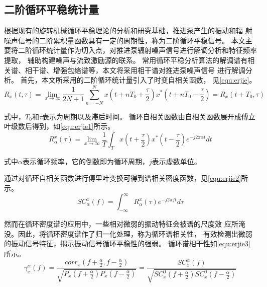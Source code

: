 \subsection{二阶循环平稳统计量}
根据现有的旋转机械循环平稳理论的分析和研究基础，推进泵产生的振动和辐
射噪声信号的二阶累积量函数具有一定的周期性，称为二阶循环平稳信号。
本文主要将二阶循环统计量作为切入点，对推进泵辐射噪声信号进行解调分析和特征频率提取，
辅助构建噪声与流致激励源的联系。
常用循环平稳分析算法的解调谱有相关谱、相干谱、增强包络谱等，本文将采用相干谱对推进泵噪声信号
进行解调分析。
首先，本文所采用的二阶循环统计量引入了时变自相关函数，
见\autoref{equ:erjie}。 
\begin{equation}
    \label{equ:erjie}
    R_{x} \left ( t,\tau  \right ) =\lim_{x \to \infty} \frac{1}{2N+1} \sum_{n=-N}^{N} x\left ( t+nT_0+\frac{\tau }{2}  \right )x^{\ast }\left ( t+nT_0-\frac{\tau }{2}  \right )=R_{x}\left ( t+T_0,\tau  \right )    
\end{equation}

式中，$T_0$和$\tau$表示为周期以及滞后时间。
循环自相关函数由自相关函数展开成傅立叶级数后得到，如\autoref{equ:erjie1}所示。
\begin{equation}
    \label{equ:erjie1}
    R_{\alpha }^{x} \left ( \tau  \right ) =\lim_{x \to \infty} \frac{1}{T}\int_{T}^{}x\left ( t+\frac{\tau }{2}  \right )x^{\ast } \left ( t-\frac{\tau }{2} \right ) e^{-j2\pi \alpha t} dt   
\end{equation}

式中$\alpha$表示循环频率，它的倒数即为循环周期，$j$表示虚数单位。

通过对循环自相关函数进行傅里叶变换可得到谱相关密度函数，见\autoref{equ:erjie2}所示。
\begin{equation}
    \label{equ:erjie2}
    SC_{\alpha }^{x} \left ( f  \right ) =\int_{-\infty }^{\infty } R_{\alpha }^{x}\left ( \tau  \right )  e^{-j2\pi f t} d\tau   
\end{equation}

然而在循环密度谱的应用中，一些相对微弱的振动特征会被谱的尺度效
应所淹没。因此，将循环密度谱作了归一化处理，称为循环谱相关性，
有效检测出微弱的振动信号特征，揭示振动信号循环平稳性的强弱。
循环谱相干性如\autoref{equ:erjie3}所示。
\begin{equation}
    \label{equ:erjie3}
    \gamma _{x}^{\alpha}\left ( f \right ) =\frac{corr_{x}\left ( f+\frac{\alpha }{2}, f-\frac{\alpha }{2} \right )  }{\sqrt{P_{x}\left ( f+\frac{\alpha }{2} \right )P_{x}\left ( f-\frac{\alpha }{2} \right ) } } =\frac{SC_{x}^{\alpha }\left ( f \right )  }{\sqrt{SC_{x}^{0} \left ( f+\frac{\alpha }{2} \right )SC_{x}^{0} \left ( f-\frac{\alpha }{2} \right )} }  
\end{equation}


